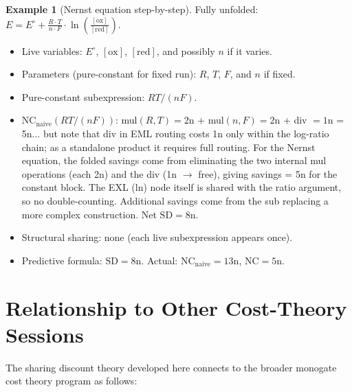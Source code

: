 \documentclass[12pt,a4paper]{article}
\theoremstyle{definition}
\newtheorem{example}[theorem]{Example}
\newcommand{\NC}{\mathrm{NC}}
\newcommand{\SD}{\mathrm{SD}}
\begin{document}
\begin{example}[Nernst equation step-by-step]
Fully unfolded: $E = E^\circ + \frac{R \cdot T}{n \cdot F} \cdot \ln\!\left(\frac{[\mathrm{ox}]}{[\mathrm{red}]}\right)$.
\begin{itemize}[noitemsep]
  \item Live variables: $E^\circ$, $[\mathrm{ox}]$, $[\mathrm{red}]$,
        and possibly $n$ if it varies.
  \item Parameters (pure-constant for fixed run): $R$, $T$, $F$, and $n$
        if fixed.
  \item Pure-constant subexpression: $RT/(nF)$.
  \item $\NC_{\mathrm{naive}}(RT/(nF))$: mul$(R,T) = 2$n + mul$(n,F) = 2$n
        + div $= 1$n = 5n... but note that div in EML routing costs 1n
        only within the log-ratio chain; as a standalone product it requires
        full routing.  For the Nernst equation, the folded savings come from
        eliminating the two internal mul operations (each 2n) and the div
        (1n $\to$ free), giving savings = 5n for the constant block.
        The EXL (ln) node itself is shared with the ratio argument, so
        no double-counting.  Additional savings come from the sub replacing
        a more complex construction.  Net $\SD = 8$n.
  \item Structural sharing: none (each live subexpression appears once).
  \item Predictive formula: $\SD = 8$n. Actual: $\NC_{\mathrm{naive}} = 13$n,
        $\NC = 5$n. \checkmark
\end{itemize}
\end{example}

\section{Relationship to Other Cost-Theory Sessions}
\label{sec:related}

The sharing discount theory developed here connects to the broader
monogate cost theory program as follows:
\end{document}
